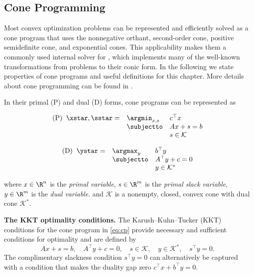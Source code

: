\subsection{Cone Programming}
Most convex optimization problems can be represented and
efficiently solved as a cone program that uses
the nonnegative orthant, second-order cone,
positive semidefinite cone, and exponential cones.
This applicability makes them a commonly used internal
solver for \cvxpy, which implements many of the
well-known transformations from problems to their
conic form.
In the following we state properties of cone programs
and useful definitions for this chapter.
More details about cone programming can be found in
\citet{boyd2004convex,ben2001lectures,busseti2018solution,odonoghue2016conic,lobo1998applications,alizadeh2003second}.

In their primal (P) and dual (D) forms,
cone programs can be represented as \\
\begin{minipage}{0.45\textwidth}
  \begin{equation*}
    \begin{array}{lll}
      \text{(P)}\;\; \xstar, \sstar =
      &\argmin_{x,s} &c^\top x\\
      &\subjectto &  Ax+s=b\\
      &  &s\in  \mathcal{K}
    \end{array}
  \end{equation*}
  \vspace{3mm}
\end{minipage}
\hfill
\begin{minipage}{0.5\textwidth}
  \begin{equation}
    \label{eq:cp}
    \begin{array}{lll}
      \text{(D)}\;\; \ystar =
      & \argmax_y & b^\top y\\
      &\subjectto & A^\top y+c=0\\
      &&y\in  \mathcal{K}^*
    \end{array}
  \end{equation}
  \vspace{3mm}
\end{minipage}
where $x\in\R^n$ is the \emph{primal variable},
$s\in\R^m$ is the \emph{primal slack variable},
$y\in\R^m$ is the \emph{dual variable}.
and $\mathcal{K}$ is a nonempty, closed, convex cone
with dual cone $\mathcal{K}^*$.

\textbf{The KKT optimality conditions.}
The Karush--Kuhn--Tucker (KKT) conditions for the
cone program in \cref{eq:cp} provide
necessary and sufficient conditions for optimality
and are defined by
\begin{equation}
\label{eq:cp-kkt}
Ax +s =b, \quad
A^\top y + c = 0, \quad
s \in \mathcal{K}, \quad
y \in \mathcal{K}^*, \quad
s^\top y = 0.
\end{equation}
The complimentary slackness condition $s^\top y = 0$ can
alternatively be captured with a condition that
makes the duality gap zero $c^\top x + b^\top y = 0$.

